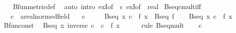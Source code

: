 \begin{isabellebody}
%
\isadelimproof
\ \ %
\endisadelimproof
%
\isatagproof
{}\isamarkupfalse%
\ Bfun{\isacharunderscore}{\kern0pt}metric{\isacharunderscore}{\kern0pt}def\ \isamarkupfalse%
\ {\isacharparenleft}{\kern0pt}auto\ intro{\isacharbang}{\kern0pt}{\isacharcolon}{\kern0pt}\ exI{\isacharbrackleft}{\kern0pt}of\ {\isacharunderscore}{\kern0pt}\ c{\isacharbrackright}{\kern0pt}\ exI{\isacharbrackleft}{\kern0pt}of\ {\isacharunderscore}{\kern0pt}\ {\isachardoublequoteopen}{}{\isacharcolon}{\kern0pt}{\isacharcolon}{\kern0pt}real{\isachardoublequoteclose}{\isacharbrackright}{\kern0pt}{\isacharparenright}{\kern0pt}%
\endisatagproof
{\isafoldproof}%
%
\isadelimproof
\isanewline
%
\endisadelimproof
\isanewline
{}\isamarkupfalse%
\ Bseq{\isacharunderscore}{\kern0pt}cmult{\isacharunderscore}{\kern0pt}iff{\isacharcolon}{\kern0pt}\isanewline
\ \ \ c\ {\isacharcolon}{\kern0pt}{\isacharcolon}{\kern0pt}\ {\isachardoublequoteopen}{\isacharprime}{\kern0pt}a{\isacharcolon}{\kern0pt}{\isacharcolon}{\kern0pt}real{\isacharunderscore}{\kern0pt}normed{\isacharunderscore}{\kern0pt}field{\isachardoublequoteclose}\isanewline
\ \ \ {\isachardoublequoteopen}c\ {\isasymnoteq}\ {}{\isachardoublequoteclose}\isanewline
\ \ \ {\isachardoublequoteopen}Bseq\ {\isacharparenleft}{\kern0pt}{\isasymlambda}x{\isachardot}{\kern0pt}\ c\ {\isacharasterisk}{\kern0pt}\ f\ x{\isacharparenright}{\kern0pt}\ {\isasymlongleftrightarrow}\ Bseq\ f{\isachardoublequoteclose}\isanewline
%
\isadelimproof
%
\endisadelimproof
%
\isatagproof
{}\isamarkupfalse%
\isanewline
\ \ \isamarkupfalse%
\ {\isachardoublequoteopen}Bseq\ {\isacharparenleft}{\kern0pt}{\isasymlambda}x{\isachardot}{\kern0pt}\ c\ {\isacharasterisk}{\kern0pt}\ f\ x{\isacharparenright}{\kern0pt}{\isachardoublequoteclose}\isanewline
\ \ \isamarkupfalse%
\ Bfun{\isacharunderscore}{\kern0pt}const\ \isamarkupfalse%
\ {\isachardoublequoteopen}Bseq\ {\isacharparenleft}{\kern0pt}{\isasymlambda}x{\isachardot}{\kern0pt}\ inverse\ c\ {\isacharasterisk}{\kern0pt}\ {\isacharparenleft}{\kern0pt}c\ {\isacharasterisk}{\kern0pt}\ f\ x{\isacharparenright}{\kern0pt}{\isacharparenright}{\kern0pt}{\isachardoublequoteclose}\isanewline
\ \ \ \ \isamarkupfalse%
\ {\isacharparenleft}{\kern0pt}rule\ Bseq{\isacharunderscore}{\kern0pt}mult{\isacharparenright}{\kern0pt}\isanewline
\ \ \isamarkupfalse%
\ {\isacartoucheopen}c\ {\isasymnoteq}\ {}{\isacartoucheclose}\ \isamarkupfalse%

\end{isabellebody}
